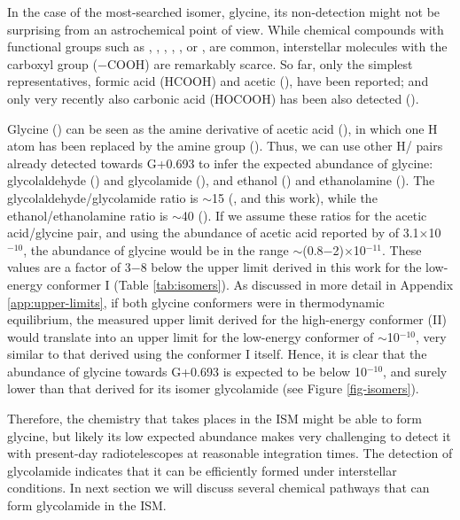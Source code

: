 \documentclass[twocolumn]{aastex63}
\begin{document}
In the case of the most-searched isomer, glycine, its non-detection might not be surprising from an astrochemical point of view. While chemical compounds with functional groups such as , , , , , or , are common,  interstellar molecules with the carboxyl group ($-$COOH) are remarkably scarce. So far, only the simplest representatives, formic acid (HCOOH) and acetic (), have been reported; and only very recently also carbonic acid (HOCOOH) has been also detected (\citealt{sanz-novo2023}).

Glycine () can be seen as the amine derivative of acetic acid (), in which one H atom has been replaced by the amine group (). Thus, we can use other H/ pairs already detected towards G+0.693 to infer the expected abundance of glycine: glycolaldehyde () and glycolamide (), and ethanol () and ethanolamine (). The glycolaldehyde/glycolamide ratio is $\sim$15 (\citealt{rivilla2022a}, and this work), while the ethanol/ethanolamine ratio is $\sim$40 (\citealt{rivilla2021a,rodriguez-almeida2021a}). If we assume these ratios for the acetic acid/glycine pair, and using the abundance of acetic acid reported by \citet{sanz-novo2023} of 3.1$\times$10$^{-10}$, the abundance of glycine would be in the range $\sim$(0.8$-$2)$\times$10$^{-11}$. These values are a factor of 3$-$8 below the upper limit derived in this work for the low-energy conformer I (Table \ref{tab:isomers}). As discussed in more detail in Appendix \ref{app:upper-limits}, if both glycine conformers were in thermodynamic equilibrium, the measured upper limit derived for the high-energy conformer (II) would translate into an upper limit for the low-energy conformer of $\sim$10$^{-10}$, very similar to that derived using the conformer I itself. Hence, it is clear that the abundance of glycine towards G+0.693 is expected to be below 10$^{-10}$, and surely lower than that derived for its isomer glycolamide (see Figure \ref{fig-isomers}).

Therefore, the chemistry that takes places in the ISM might be able to form glycine, but likely its low expected abundance makes very challenging to detect it with present-day radiotelescopes at reasonable integration times. The detection of glycolamide indicates that it can be efficiently formed under interstellar conditions. In next section we will discuss several chemical pathways that can form glycolamide in the ISM.
\end{document}
